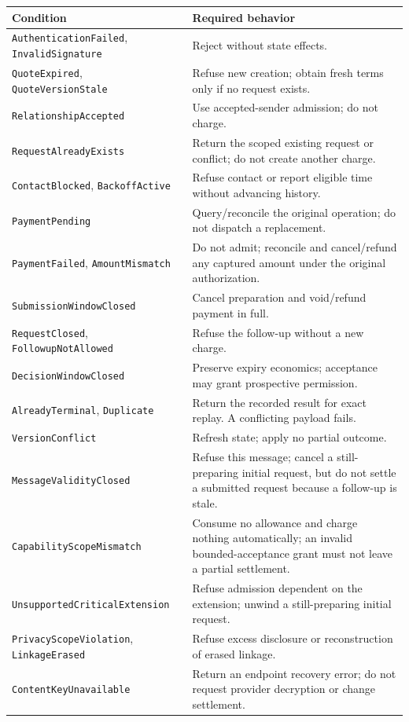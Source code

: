\documentclass[11pt]{article}
\begin{document}
\begingroup
\small
\begin{longtable}{@{}>{\raggedright\arraybackslash}p{}>{\raggedright\arraybackslash}p{}@{}}
\toprule
Condition & Required behavior \\
\midrule
\endhead
\texttt{AuthenticationFailed}, \texttt{InvalidSignature} & Reject without state effects. \\
\texttt{QuoteExpired}, \texttt{QuoteVersionStale} & Refuse new creation; obtain fresh terms only if no request exists. \\
\texttt{RelationshipAccepted} & Use accepted-sender admission; do not charge. \\
\texttt{RequestAlreadyExists} & Return the scoped existing request or conflict; do not create another charge. \\
\texttt{ContactBlocked}, \texttt{BackoffActive} & Refuse contact or report eligible time without advancing history. \\
\texttt{PaymentPending} & Query/reconcile the original operation; do not dispatch a replacement. \\
\texttt{PaymentFailed}, \texttt{AmountMismatch} & Do not admit; reconcile and cancel/refund any captured amount under the original authorization. \\
\texttt{SubmissionWindowClosed} & Cancel preparation and void/refund payment in full. \\
\texttt{RequestClosed}, \texttt{FollowupNotAllowed} & Refuse the follow-up without a new charge. \\
\texttt{DecisionWindowClosed} & Preserve expiry economics; acceptance may grant prospective permission. \\
\texttt{AlreadyTerminal}, \texttt{Duplicate} & Return the recorded result for exact replay. A conflicting payload fails. \\
\texttt{VersionConflict} & Refresh state; apply no partial outcome. \\
\texttt{MessageValidityClosed} & Refuse this message; cancel a still-preparing initial request, but do not settle a submitted request because a follow-up is stale. \\
\texttt{CapabilityScopeMismatch} & Consume no allowance and charge nothing automatically; an invalid bounded-acceptance grant must not leave a partial settlement. \\
\texttt{UnsupportedCriticalExtension} & Refuse admission dependent on the extension; unwind a still-preparing initial request. \\
\texttt{PrivacyScopeViolation}, \texttt{LinkageErased} & Refuse excess disclosure or reconstruction of erased linkage. \\
\texttt{ContentKeyUnavailable} & Return an endpoint recovery error; do not request provider decryption or change settlement. \\
\bottomrule
\end{longtable}
\endgroup
\end{document}
